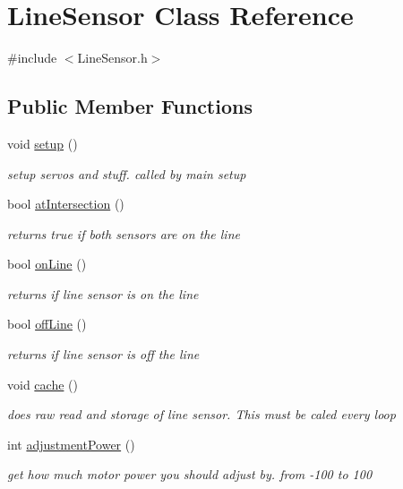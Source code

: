 \hypertarget{classLineSensor}{\section{Line\-Sensor Class Reference}
\label{classLineSensor}
}


{\ttfamily \#include $<$Line\-Sensor.\-h$>$}

\subsection*{Public Member Functions}
\begin{DoxyCompactItemize}
\item 
void \hyperlink{classLineSensor_a555f6f7222ea1e76ed810edbde44c39c}{setup} ()
\begin{DoxyCompactList}\small\item\em setup servos and stuff. called by main setup \end{DoxyCompactList}\item 
bool \hyperlink{classLineSensor_a6769cf781edb7ac4a43086cd62be01e2}{at\-Intersection} ()
\begin{DoxyCompactList}\small\item\em returns true if both sensors are on the line \end{DoxyCompactList}\item 
bool \hyperlink{classLineSensor_ad9d3c5a694f1ff946d1137df1694b026}{on\-Line} ()
\begin{DoxyCompactList}\small\item\em returns if line sensor is on the line \end{DoxyCompactList}\item 
bool \hyperlink{classLineSensor_a0dea8f6d7e7e27d050feecb3e549a149}{off\-Line} ()
\begin{DoxyCompactList}\small\item\em returns if line sensor is off the line \end{DoxyCompactList}\item 
void \hyperlink{classLineSensor_afc809d2aa49426d949f76f68b0154050}{cache} ()
\begin{DoxyCompactList}\small\item\em does raw read and storage of line sensor. This must be caled every loop \end{DoxyCompactList}\item 
int \hyperlink{classLineSensor_a74c3c2d7a454aeacae90501670d01bdc}{adjustment\-Power} ()
\begin{DoxyCompactList}\small\item\em get how much motor power you should adjust by. from -\/100 to 100 \end{DoxyCompactList}\end{DoxyCompactItemize}
